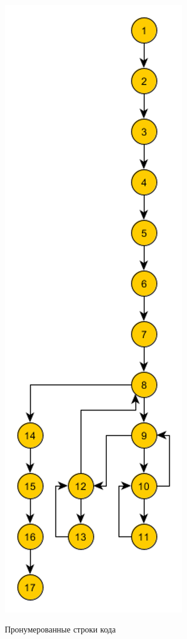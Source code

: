 \documentclass[12pt]{report}
\begin{document}
		\begin{figure}[H]	
					\centering	
		{\includegraphics[scale=0.8]{img/gu.png}}
		\caption{Пронумерованные строки кода}
	\end{figure}
\end{document}
